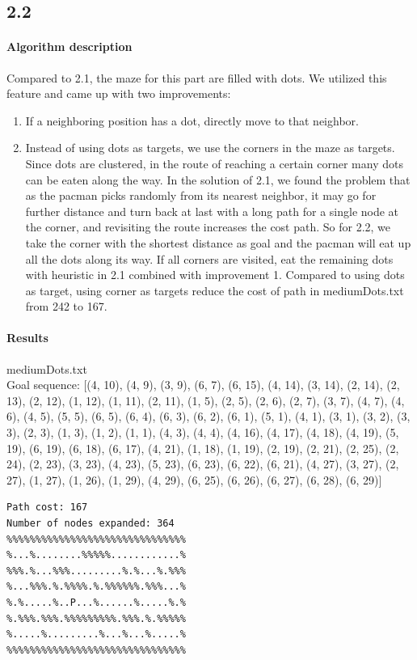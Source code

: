 \begin{multicols*}{2}
\begin{Verbatim}[samepage=true]
\end{Verbatim}
\subsection*{2.2}
\paragraph{Algorithm description}
Compared to 2.1, the maze for this part are filled with dots. We utilized this feature and came up with two improvements:\\
\begin{enumerate}[itemsep=0mm]
  \item If a neighboring position has a dot, directly move to that neighbor.
  \item Instead of using dots as targets, we use the corners in the maze as targets. Since dots are clustered, in the route of reaching a certain corner many dots can be eaten along the way. In the solution of 2.1, we found the problem that as the pacman picks randomly from its nearest neighbor, it may go for further distance and turn back at last with a long path for a single node at the corner, and revisiting the route increases the cost path. So for 2.2, we take the corner with the shortest distance as goal and the pacman will eat up all the dots along its way. If all corners are visited, eat the remaining dots with heuristic in 2.1 combined with improvement 1. Compared to using dots as target, using corner as targets reduce the cost of path in mediumDots.txt from 242 to 167.
\end{enumerate}
\paragraph{Results}
mediumDots.txt\\
Goal sequence:
[(4, 10), (4, 9), (3, 9), (6, 7), (6, 15), (4, 14), (3, 14), (2, 14), (2, 13), (2, 12), (1, 12), (1, 11), (2, 11), (1, 5), (2, 5), (2, 6), (2, 7), (3, 7), (4, 7), (4, 6), (4, 5), (5, 5), (6, 5), (6, 4), (6, 3), (6, 2), (6, 1), (5, 1), (4, 1), (3, 1), (3, 2), (3, 3), (2, 3), (1, 3), (1, 2), (1, 1), (4, 3), (4, 4), (4, 16), (4, 17), (4, 18), (4, 19), (5, 19), (6, 19), (6, 18), (6, 17), (4, 21), (1, 18), (1, 19), (2, 19), (2, 21), (2, 25), (2, 24), (2, 23), (3, 23), (4, 23), (5, 23), (6, 23), (6, 22), (6, 21), (4, 27), (3, 27), (2, 27), (1, 27), (1, 26), (1, 29), (4, 29), (6, 25), (6, 26), (6, 27), (6, 28), (6, 29)]
\begin{Verbatim}[samepage=true]
Path cost: 167
Number of nodes expanded: 364
%%%%%%%%%%%%%%%%%%%%%%%%%%%%%%%
%...%........%%%%%............%
%%%.%...%%%.........%.%...%.%%%
%...%%%.%.%%%%.%.%%%%%%.%%%...%
%.%.....%..P...%......%.....%.%
%.%%%.%%%.%%%%%%%%%.%%%.%.%%%%%
%.....%.........%...%...%.....%
%%%%%%%%%%%%%%%%%%%%%%%%%%%%%%%


\end{Verbatim}
\end{multicols*}
